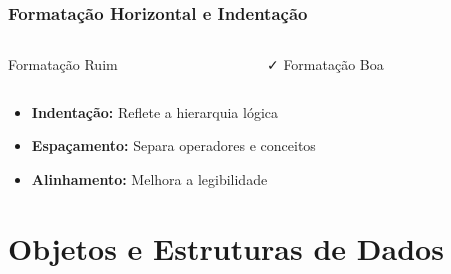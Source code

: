 \documentclass[aspectratio=169]{beamer}
\begin{document}
\begin{frame}
\frametitle{Formatação Horizontal e Indentação}

\begin{columns}
\begin{column}{0.5\textwidth}
\begin{block}{\textcolor{cleanred}{\faTimes} Formatação Ruim}

\end{block}
\end{column}

\begin{column}{0.5\textwidth}
\begin{block}{\textcolor{cleangreen}{\faCheck} Formatação Boa}

\end{block}
\end{column}
\end{columns}

\vspace{0.5cm}
\begin{itemize}
    \item \textbf{Indentação:} Reflete a hierarquia lógica
    \item \textbf{Espaçamento:} Separa operadores e conceitos
    \item \textbf{Alinhamento:} Melhora a legibilidade
\end{itemize}
\end{frame}

\section{Objetos e Estruturas de Dados}
\end{document}
